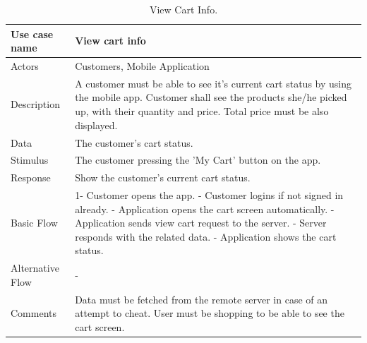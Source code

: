 \documentclass[11pt]{article}
\begin{document}
        
                
        \begin{table}[H]
        \begin{centering}
        \begin{tabular}{|p{2.5cm}|p{12cm}|}
        \hline
        Use case name & View cart info  \\ \hline
        Actors        & Customers, Mobile Application \\ \hline
        Description   & A customer must be able to see it's current cart status 
                        by using the mobile app. Customer shall see the products she/he picked up, with their quantity and price. Total price must be also displayed. \\ \hline
        Data          & The customer's cart status. \\ \hline
        Stimulus      & The customer pressing the 'My Cart' button on the app.  \\ \hline
        Response      & Show the customer's current cart status.  \\ \hline
        Basic Flow    & 
        1- Customer opens the app. \newline
        2- Customer logins if not signed in already. \newline
        3- Application opens the cart screen automatically. \newline
        4- Application sends view cart request to the server. \newline
        5- Server responds with the related data. \newline
        6- Application shows the cart status. \\ \hline
        Alternative
            Flow      & - \\ \hline
        Comments      & Data must be fetched from the remote server in case of an attempt to cheat. User must be shopping to be able to see the cart screen.\\ \hline
        
        \end{tabular}
        \caption{View Cart Info.}
        \label{tab4}
        \end{centering}
        \end{table}    
        
        
        
\end{document}
